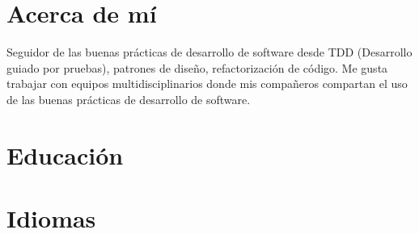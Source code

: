 \documentclass[10pt,a4paper,sans,colorlinks]{moderncv} %
\begin{document}

\makecvtitle %

\section{Acerca de mí}
  Seguidor de las buenas prácticas de desarrollo de software desde TDD (Desarrollo guiado por pruebas), patrones de diseño, refactorización de código.
  Me gusta trabajar con equipos multidisciplinarios donde mis compañeros compartan el uso de las buenas prácticas de desarrollo de software.

\section{Educación}





\section{Idiomas}
\end{document}
